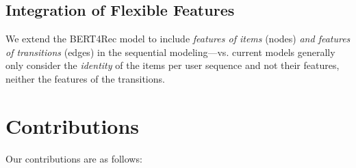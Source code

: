

\subsection{Integration of Flexible Features}
We extend the BERT4Rec model to include \emph{features of items} (nodes) \emph{and features of transitions} (edges) in the sequential modeling---vs. current models generally only consider the \emph{identity} of the items per user sequence and not their features, neither the features of the transitions.


\section{Contributions}

Our contributions are as follows:


